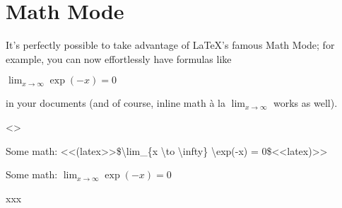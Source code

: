 
\begin{multicols}{2}\end{multicols}
\section{Math Mode
}
\begin{multicols}{2}It’s perfectly possible to take advantage of
\LaTeX{}'s famous Math Mode; for example,
you can now effortlessly have formulas like\mktsShowpar\par
$\lim_{x \to \infty} \exp(-x) = 0$\mktsShowpar\par
in your documents (and of course, inline math {\mktsStyleItalic{}à la}
$\lim_{x \to \infty}$ works as well).\mktsShowpar\par
\end{multicols}<>\mktsShowpar\par
Some math: {\mktsStyleCode{}<<(latex>>\$\textbackslash{}lim\_\{x \textbackslash{}to \textbackslash{}infty\} \textbackslash{}exp(-x) = 0\$<<latex)>>}\mktsShowpar\par
Some math: $\lim_{x \to \infty} \exp(-x) = 0$\mktsShowpar\par
xxx\mktsShowpar\par

